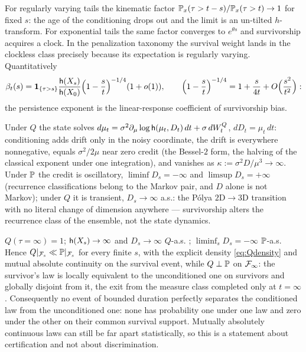 \begin{remark}
\label{rem:noclock}
For regularly varying tails the kinematic factor
$\mathbb{P}_x(\tau>t-s)/\mathbb{P}_x(\tau>t)\to1$ for fixed $s$: the age of the
conditioning drops out and the limit is an un-tilted $h$-transform.
For exponential tails the same factor converges to $e^{\theta s}$ and
survivorship acquires a clock. In the penalization taxonomy
\cite{RVY06} the survival weight lands in the clockless class
precisely because its expectation is regularly varying. Quantitatively
\begin{equation}\label{eq:rate}
\beta_t(s)=\mathbf{1}_{\{\tau>s\}}\frac{\mathsf{h}(X_s)}{\mathsf{h}(X_0)}
\Bigl(1-\frac st\Bigr)^{-1/4}(1+o(1)),
\qquad
\Bigl(1-\frac st\Bigr)^{-1/4}=1+\frac{s}{4t}+O\Bigl(\frac{s^2}{t^2}\Bigr):
\end{equation}
the persistence exponent is the linear-response coefficient of
survivorship bias.
\end{remark}

\begin{theorem}\label{thm:drift}
Under $Q$ the state solves
$d\mu_t=\sigma^2\partial_\mu\log\mathsf{h}(\mu_t,D_t)\,dt+\sigma\,dW^Q_t$,
$dD_t=\mu_t\,dt$: conditioning adds drift only in the noisy
coordinate, the drift is everywhere nonnegative, equals
$\sigma^2/2\mu$ near zero credit (the Bessel-$2$ form, the halving of
the classical exponent under one integration), and vanishes as
$\kappa:=\sigma^2D/\mu^3\to\infty$. Under $\mathbb{P}$ the credit is oscillatory,
$\liminf D_s=-\infty$ and $\limsup D_s=+\infty$ (recurrence
classifications belong to the Markov pair, and $D$ alone is not
Markov); under $Q$ it is transient, $D_s\to\infty$ a.s.: the
P\'olya $2\mathrm D\to3\mathrm D$ transition with no literal change of
dimension anywhere --- survivorship alters the recurrence class of the
ensemble, not the state dynamics.
\end{theorem}

\begin{theorem}
\label{thm:singular}
$Q(\tau=\infty)=1$; $\mathsf{h}(X_s)\to\infty$ and $D_s\to\infty$ $Q$-a.s.
\cite{GJW99}; $\liminf_sD_s=-\infty$ $\mathbb{P}$-a.s. Hence
$Q|_{\mathcal{F}_s}\ll\mathbb{P}|_{\mathcal{F}_s}$ for every finite $s$, with the explicit
density \eqref{eq:Qdensity} and mutual absolute continuity on the
survival event, while $Q\perp\mathbb{P}$ on $\mathcal{F}_\infty$: the survivor's
law is locally equivalent to the unconditioned one on survivors and
globally disjoint from it, the exit from the measure class completed
only at $t=\infty$. Consequently no event of bounded duration perfectly separates the
conditioned law from the unconditioned one: none has probability one
under one law and zero under the other on their common survival
support. Mutually absolutely continuous laws can still be far apart
statistically, so this is a statement about certification and not
about discrimination.
\end{theorem}

